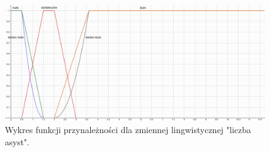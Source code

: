 \documentclass{classrep}
\begin{document}
\begin{enumerate}
    \begin{figure}[H]
        \centering
        \includegraphics[width=14cm]{wykres_asysty.png}
        \caption{Wykres funkcji przynależności dla zmiennej lingwistycznej "liczba asyst".}
        \label{rysunek:asysty}
    \end{figure}
    

\end{enumerate}
\end{document}
